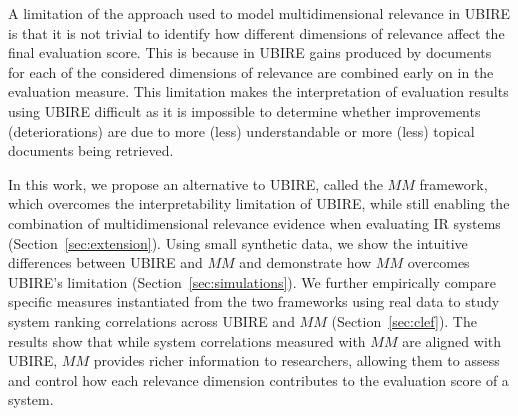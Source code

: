 A limitation of the approach used to model multidimensional relevance in UBIRE is that it is not trivial to identify how different dimensions of relevance affect the final evaluation score. This is because in UBIRE gains produced by documents for each of the considered dimensions of relevance are combined early on in the evaluation measure. This limitation makes the interpretation of evaluation results using UBIRE difficult as it is impossible to determine whether improvements (deteriorations) are due to more (less) understandable or more (less) topical documents being retrieved. 

In this work, we propose an alternative to UBIRE, called the $MM$ framework, which overcomes the interpretability limitation of UBIRE, while still enabling the combination of multidimensional relevance evidence when evaluating IR systems (Section~\ref{sec:extension}). Using small synthetic data, we show the intuitive differences between UBIRE and $MM$ and demonstrate how $MM$ overcomes UBIRE's limitation (Section~\ref{sec:simulations}). We further empirically compare specific measures instantiated from the two frameworks using real data to study system ranking correlations across UBIRE and $MM$ (Section~\ref{sec:clef}). The results show that while system correlations measured with $MM$ are aligned with UBIRE, $MM$ provides richer information to researchers, allowing them to assess and control how each relevance dimension contributes to the evaluation score of a system.



